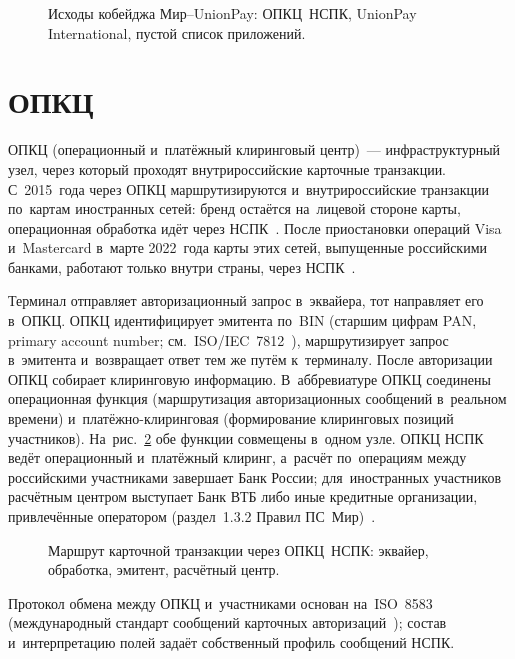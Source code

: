 \begin{figure}[t]
  \centering
  \caption{Исходы кобейджа Мир--UnionPay: ОПКЦ~НСПК, UnionPay
  International, пустой список приложений.}\label{fig:mir-unionpay-routing}
\end{figure}
\FloatBarrier

\section{ОПКЦ}\label{sec:mir-opkc}

ОПКЦ (операционный и~платёжный клиринговый центр)~--- инфраструктурный узел,
через который проходят внутрироссийские карточные транзакции. С~2015~года
через ОПКЦ маршрутизируются и~внутрироссийские транзакции по~картам
иностранных сетей: бренд остаётся на~лицевой стороне карты, операционная
обработка идёт через НСПК~\cite{nspk-about-company,cbr-ps}. После
приостановки операций Visa и~Mastercard в~марте 2022~года карты этих сетей,
выпущенные российскими банками, работают только внутри страны, через
НСПК~\cite{izvestia-cbr-visa-mc-2022}.

Терминал отправляет авторизационный запрос в~эквайера, тот направляет его
в~ОПКЦ. ОПКЦ идентифицирует эмитента по~BIN (старшим цифрам PAN, primary
account number; см.~ISO/IEC~7812~\cite{iso-7812-transition}), маршрутизирует
запрос в~эмитента и~возвращает ответ тем же путём к~терминалу. После
авторизации ОПКЦ собирает клиринговую информацию. В~аббревиатуре ОПКЦ соединены операционная функция (маршрутизация
авторизационных сообщений в~реальном времени) и~платёжно-клиринговая
(формирование клиринговых позиций участников).
На~рис.~\ref{fig:opkc-flow} обе функции совмещены в~одном узле. ОПКЦ НСПК ведёт
операционный и~платёжный клиринг, а~расчёт по~операциям между российскими
участниками завершает Банк России; для~иностранных участников расчётным центром
выступает Банк ВТБ либо иные кредитные организации, привлечённые оператором
(раздел~1.3.2 Правил ПС~Мир)~\cite{nspk-mir-rules-v43,fz-161,cbr-876p}.

\begin{figure}[!htb]
  \centering
  \caption{Маршрут карточной транзакции через ОПКЦ~НСПК: эквайер,
  обработка, эмитент, расчётный центр.}\label{fig:opkc-flow}
\end{figure}
\FloatBarrier

Протокол обмена между ОПКЦ и~участниками основан на~ISO~8583 (международный
стандарт сообщений карточных авторизаций~\cite{iso-8583-2023}); состав
и~интерпретацию полей задаёт собственный профиль сообщений НСПК.

